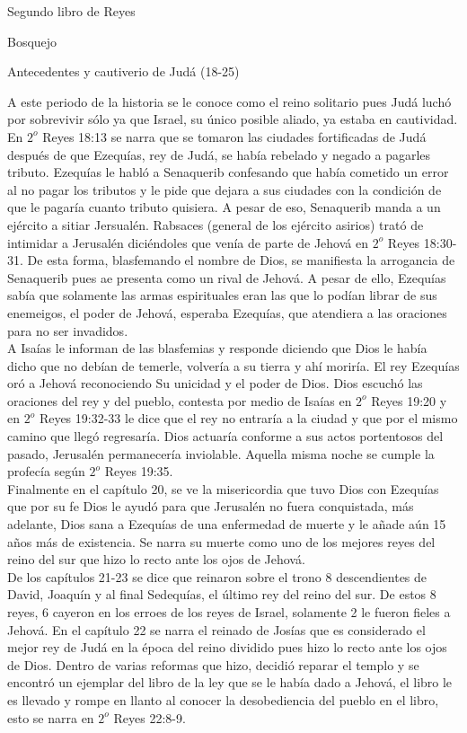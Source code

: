 \begin{section}{Segundo libro de Reyes}
\begin{subsection}{Bosquejo}
\begin{subsubsection}{Antecedentes y cautiverio de Judá (18-25)}
\begin{enumerate}
					A este periodo de la historia se le conoce como el reino solitario pues Judá luchó por sobrevivir sólo ya que Israel, su único posible aliado, ya estaba en cautividad. En $2^{o}$ Reyes 18:13 se narra que se tomaron las ciudades fortificadas de Judá después de que Ezequías, rey de Judá, se había rebelado y negado a pagarles tributo. Ezequías le habló a Senaquerib confesando que había cometido un error al no pagar los tributos y le pide que dejara a sus ciudades con la condición de que le pagaría cuanto tributo quisiera. A pesar de eso, Senaquerib manda a un ejército a sitiar Jersualén. Rabsaces (general de los ejército asirios) trató de intimidar a Jerusalén diciéndoles que venía de parte de Jehová en $2^{o}$ Reyes 18:30-31. De esta forma, blasfemando el nombre de Dios, se manifiesta la arrogancia de Senaquerib pues ae presenta como un rival de Jehová. A pesar de ello, Ezequías sabía que solamente las armas espirituales eran las que lo podían librar de sus enemeigos, el poder de Jehová, esperaba Ezequías, que atendiera a las oraciones para no ser invadidos.\\
					A Isaías le informan de las blasfemias y responde diciendo que Dios le había dicho que no debían de temerle, volvería a su tierra y ahí moriría. El rey Ezequías oró a Jehová reconociendo Su unicidad y el poder de Dios. Dios escuchó las oraciones del rey y del pueblo, contesta por medio de Isaías en $2^{o}$ Reyes 19:20 y en $2^{o}$ Reyes 19:32-33 le dice que el rey no entraría a la ciudad y que por el mismo camino que llegó regresaría. Dios actuaría conforme a sus actos portentosos del pasado, Jerusalén permanecería inviolable. Aquella misma noche se cumple la profecía según $2^{o}$ Reyes 19:35.\\
					Finalmente en el capítulo 20, se ve la misericordia que tuvo Dios con Ezequías que por su fe Dios le ayudó para que Jerusalén no fuera conquistada, más adelante, Dios sana a Ezequías de una enfermedad de muerte y le añade aún 15 años más de existencia.
					\newpage
					Se narra su muerte como uno de los mejores reyes del reino del sur que hizo lo recto ante los ojos de Jehová.\\
					De los capítulos 21-23 se dice que reinaron sobre el trono 8 descendientes de David, Joaquín y al final Sedequías, el último rey del reino del sur. De estos 8 reyes, 6 cayeron en los erroes de los reyes de Israel, solamente 2 le fueron fieles a Jehová. En el capítulo 22 se narra el reinado de Josías que es considerado el mejor rey de Judá en la época del reino dividido pues hizo lo recto ante los ojos de Dios. Dentro de varias reformas que hizo, decidió reparar el templo y se encontró un ejemplar del libro de la ley que se le había dado a Jehová, el libro le es llevado y rompe en llanto al conocer la desobediencia del pueblo en el libro, esto se narra en $2^{o}$ Reyes 22:8-9.

\end{enumerate}
\end{subsubsection}
\end{subsection}
\end{section}
